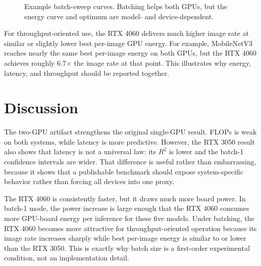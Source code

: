 \documentclass[conference]{IEEEtran}
\begin{document}
\begin{figure}[t]
\centering
{}
\caption{Example batch-sweep curves. Batching helps both GPUs, but the energy
curve and optimum are model- and device-dependent.}
\label{fig:batch-energy}
\end{figure}

For throughput-oriented use, the RTX 4060 delivers much higher image rate at
similar or slightly lower best per-image GPU energy. For example, MobileNetV3
reaches nearly the same best per-image energy on both GPUs, but the RTX 4060
achieves roughly 6.7$\times$ the image rate at that point. This illustrates why
energy, latency, and throughput should be reported together.

\section{Discussion}

The two-GPU artifact strengthens the original single-GPU result. FLOPs is weak
on both systems, while latency is more predictive. However, the RTX 3050 result
also shows that latency is not a universal law: its $R^2$ is lower and the
batch-1 confidence intervals are wider. That difference is useful rather than
embarrassing, because it shows that a publishable benchmark should expose
system-specific behavior rather than forcing all devices into one proxy.

The RTX 4060 is consistently faster, but it draws much more board power. In
batch-1 mode, the power increase is large enough that the RTX 4060 consumes
more GPU-board energy per inference for these five models. Under batching, the
RTX 4060 becomes more attractive for throughput-oriented operation because its
image rate increases sharply while best per-image energy is similar to or
lower than the RTX 3050. This is exactly why batch size is a first-order
experimental condition, not an implementation detail.
\end{document}
